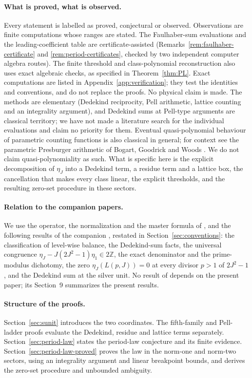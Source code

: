 \documentclass[11pt]{article}
\theoremstyle{definition}
\newcommand{\Z}{\mathbb Z}
\begin{document}
\paragraph{What is proved, what is observed.}  Every statement is
labelled as proved, conjectural or observed.  Observations are finite
computations whose ranges are stated.  The Faulhaber-sum evaluations and
the leading-coefficient table are certificate-assisted
(Remarks~\ref{rem:faulhaber-certificate} and \ref{rem:period-certificates},
checked by two independent computer algebra routes).  The finite
threshold and class-polynomial reconstruction also uses exact algebraic
checks, as specified in Theorem~\ref{thm:PL}.  Exact computations
are listed in Appendix~\ref{app:verification}; they test the identities
and conventions, and do not replace the proofs.  No physical claim is
made.  The methods are elementary (Dedekind reciprocity, Pell arithmetic,
lattice counting and an integrality argument), and Dedekind sums at
Pell-type arguments are classical territory; we have not made a
literature search for the individual evaluations and claim no priority
for them.  Eventual quasi-polynomial behaviour of parametric counting
functions is also classical in general; for context see the parametric
Presburger arithmetic of Bogart, Goodrick and Woods \cite{BGW2017}.  We
do not claim quasi-polynomiality as such.  What is specific here is the
explicit decomposition of $\eta_J$ into a Dedekind term, a residue term
and a lattice box, the cancellation that makes every class linear, the
explicit thresholds, and the resulting zero-set procedure in these
sectors.

\paragraph{Relation to the companion papers.}  We use the operator, the
normalization and the master formula of
\cite{MahmoodP1Collection2026}, and the following results of the
companion \cite{LensChirality2026}, restated in
Section~\ref{sec:conventions}: the classification of level-wise balance,
the Dedekind-sum facts, the universal congruence
$\eta_J-J(2J^2-1)\eta_1\in2\Z$, the exact denominator and the
prime-modulus dichotomy, the zero $\eta_J(L(p,J))=0$ at every divisor
$p>1$ of $2J^2-1$, and the Dedekind sum at the silver unit.  No result of
\cite{LensChirality2026} depends on the present paper; its Section~9 summarizes the present
results.

\paragraph{Structure of the proofs.}  Section~\ref{sec:sunit} introduces
the two coordinates.  The fifth-family and Pell-ladder proofs evaluate
the Dedekind, residue and lattice terms separately.
Section~\ref{sec:period-law} states the period-law conjecture and its
finite evidence.  Section~\ref{sec:period-law-proved} proves the law in
the norm-one and norm-two sectors, using an integrality argument and
linear breakpoint bounds, and derives the zero-set procedure and
unbounded ambiguity.
\end{document}
